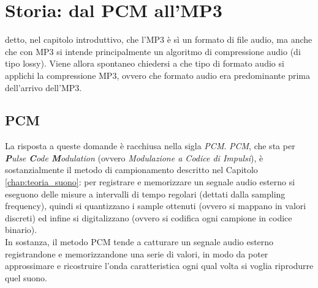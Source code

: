 \chapter{Storia: dal PCM all'MP3} \label{chap:storia}
	 detto, nel capitolo introduttivo, che l'MP3 è sì un formato di file audio, ma anche che con MP3 si intende principalmente un algoritmo di compressione audio (di tipo lossy). Viene allora spontaneo chiedersi a che tipo di formato audio si applichi la compressione MP3, ovvero che formato audio era predominante prima dell'arrivo dell'MP3.
	
	\section{PCM} \label{sec:pcm}
		La risposta a queste domande è racchiusa nella sigla \textit{PCM}. \textit{PCM}, che sta per \textit{\textbf{P}ulse \textbf{C}ode \textbf{M}odulation} (ovvero \textit{Modulazione a Codice di Impulsi}), è sostanzialmente il metodo di campionamento descritto nel Capitolo \ref{chap:teoria_suono}: per registrare e memorizzare un segnale audio esterno si eseguono delle misure a intervalli di tempo regolari (dettati dalla sampling frequency), quindi si quantizzano i sample ottenuti (ovvero si mappano in valori discreti) ed infine si digitalizzano (ovvero si codifica ogni campione in codice binario).\\
		In sostanza, il metodo PCM tende a catturare un segnale audio esterno registrandone e memorizzandone una serie di valori, in modo da poter approssimare e ricostruire l'onda caratteristica ogni qual volta si voglia riprodurre quel suono.
		
